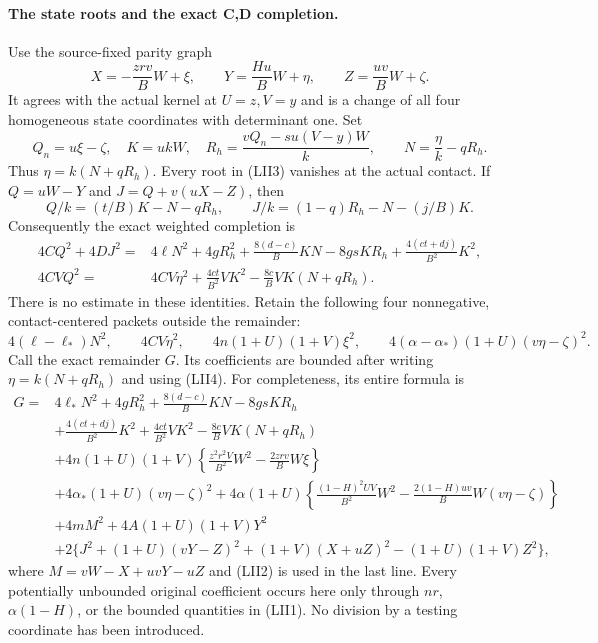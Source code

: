 \paragraph{The state roots and the exact C,D completion.}
Use the source-fixed parity graph
\[
 X=-\frac{zr v}{B}W+\xi,\qquad
 Y=\frac{Hu}{B}W+\eta,\qquad
 Z=\frac{uv}{B}W+\zeta.                         \tag{LII2}
\]
It agrees with the actual kernel at $U=z,V=y$ and is a change of all
four homogeneous state coordinates with determinant one.  Set
\[
 Q_n=u\xi-\zeta,\quad K=ukW,\quad
 R_h=\frac{vQ_n-su(V-y)W}{k},\qquad
 N=\frac\eta k-qR_h.                              \tag{LII3}
\]
Thus $\eta=k(N+qR_h)$.  Every root in (LII3) vanishes at the actual
contact.  If $Q=uW-Y$ and $J=Q+v(uX-Z)$, then
\[
 Q/k=(t/B)K-N-qR_h,\qquad
 J/k=(1-q)R_h-N-(j/B)K.
\]
Consequently the exact weighted completion is
\[
\begin{split}
 4CQ^2+4DJ^2={}&4\ell N^2+4gR_h^2
 +\frac{8(d-c)}BKN-8gsKR_h
 +\frac{4(ct+dj)}{B^2}K^2,\\
 4CVQ^2={}&4CV\eta^2
 +\frac{4ct}{B^2}VK^2-\frac{8c}BVK(N+qR_h).
                                                        \end{split}\tag{LII4}
\]
There is no estimate in these identities.  Retain the following
four nonnegative, contact-centered packets outside the remainder:
\[
 4(\ell-\ell_*)N^2,\qquad 4CV\eta^2,\qquad
 4n(1+U)(1+V)\xi^2,\qquad
 4(\alpha-\alpha_*)(1+U)(v\eta-\zeta)^2.          \tag{LII5}
\]
Call the exact remainder $G$.  Its coefficients are bounded after
writing $\eta=k(N+qR_h)$ and using (LII4).  For completeness, its
entire formula is
\[
\begin{split}
G={}&4\ell_*N^2+4gR_h^2+\frac{8(d-c)}BKN-8gsKR_h\\
 &+\frac{4(ct+dj)}{B^2}K^2
 +\frac{4ct}{B^2}VK^2-\frac{8c}BVK(N+qR_h)\\
 &+4n(1+U)(1+V)
   \left\{\frac{z^2r^2V}{B^2}W^2-\frac{2zr v}B W\xi\right\}\\
 &+4\alpha_*(1+U)(v\eta-\zeta)^2
  +4\alpha(1+U)
   \left\{\frac{(1-H)^2UV}{B^2}W^2
        -\frac{2(1-H)uv}B W(v\eta-\zeta)\right\}\\
 &+4mM^2+4A(1+U)(1+V)Y^2\\
 &+2\{J^2+(1+U)(vY-Z)^2+(1+V)(X+uZ)^2
                      -(1+U)(1+V)Z^2\},        \end{split}\tag{LII6}
\]
where $M=vW-X+uvY-uZ$ and (LII2) is used in the last line.
Every potentially unbounded original coefficient occurs here only
through $nr$, $\alpha(1-H)$, or the bounded quantities in (LII1).
No division by a testing coordinate has been introduced.

